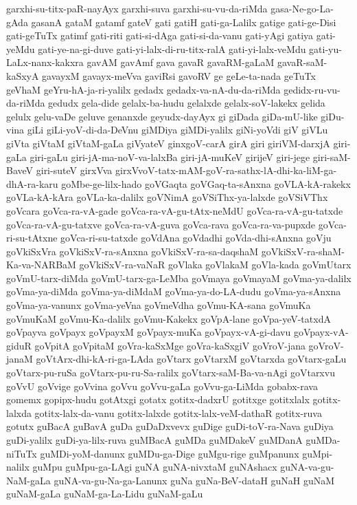 {garxhi-su-titx-paR-nayAyx
garxhi-suva
garxhi-su-vu-da-riMda
gasa-Ne-go-La-gAda
gasanA
gataM
gatamf
gateV
gati
gatiH
gati-ga-Lalilx
gatige
gati-ge-Disi
gati-geTuTx
gatimf
gati-riti
gati-si-dAga
gati-si-da-vanu
gati-yAgi
gatiya
gati-yeMdu
gati-ye-na-gi-duve
gati-yi-lalx-di-ru-titx-ralA
gati-yi-lalx-veMdu
gati-yu-LaLx-nanx-kakxra
gavAM
gavAmf
gava
gavaR
gavaRM-gaLaM
gavaR-saM-kaSxyA
gavayxM
gavayx-meVva
gaviRsi
gavoRV
ge
geLe-ta-nada
geTuTx
geVhaM
geYru-hA-ja-ri-yalilx
gedadx
gedadx-va-nA-du-da-riMda
gedidx-ru-vu-da-riMda
gedudx
gela-dide
gelalx-ba-hudu
gelalxde
gelalx-soV-lakekx
gelida
gelulx
gelu-vaDe
geluve
genanxde
geyudx-dayAyx
gi
giDada
giDa-mU-like
giDu-vina
giLi
giLi-yoV-di-da-DeVnu
giMDiya
giMDi-yalilx
giNi-yoVdi
giV
giVLu
giVta
giVtaM
giVtaM-gaLa
giVyateV
ginxgoV-carA
girA
giri
giriVM-darxjA
giri-gaLa
giri-gaLu
giri-jA-ma-noV-va-lalxBa
giri-jA-muKeV
girijeV
giri-jege
giri-saM-BaveV
giri-suteV
girxVva
girxVvoV-tatx-mAM-goV-ra-sathx-lA-dhi-ka-liM-ga-dhA-ra-karu
goMbe-ge-lilx-hado
goVGaqta
goVGaq-ta-sAnxna
goVLA-kA-rakekx
goVLa-kA-kAra
goVLa-ka-dalilx
goVNimA
goVSiThx-ya-lalxde
goVSiVThx
goVcara
goVca-ra-vA-gade
goVca-ra-vA-gu-tAtx-neMdU
goVca-ra-vA-gu-tatxde
goVca-ra-vA-gu-tatxve
goVca-ra-vA-guva
goVca-rava
goVca-ra-va-pupxde
goVca-ri-su-tAtxne
goVca-ri-su-tatxde
goVdAna
goVdadhi
goVda-dhi-sAnxna
goVju
goVkiSxVra
goVkiSxV-ra-sAnxna
goVkiSxV-ra-sa-daqshaM
goVkiSxV-ra-shaM-Ka-va-NARBaM
goVkiSxV-ra-vaNaR
goVlaka
goVlakaM
goVla-kada
goVmUtarx
goVmU-tarx-diMda
goVmU-tarx-ga-LeMba
goVmaya
goVmayaM
goVma-ya-dalilx
goVma-ya-diMda
goVma-ya-diMdaM
goVma-ya-do-LA-dudu
goVma-ya-sAnxna
goVma-ya-vanunx
goVma-yeVna
goVmeVdha
goVmu-KA-sana
goVmuKa
goVmuKaM
goVmu-Ka-dalilx
goVmu-Kakekx
goVpA-lane
goVpa-yeV-tatxdA
goVpayva
goVpayx
goVpayxM
goVpayx-muKa
goVpayx-vA-gi-davu
goVpayx-vA-giduR
goVpitA
goVpitaM
goVra-kaSxMge
goVra-kaSxgiV
goVroV-jana
goVroV-janaM
goVtArx-dhi-kA-ri-ga-LAda
goVtarx
goVtarxM
goVtarxda
goVtarx-gaLu
goVtarx-pu-ruSa
goVtarx-pu-ru-Sa-ralilx
goVtarx-saM-Ba-va-nAgi
goVtarxvu
goVvU
goVvige
goVvina
goVvu
goVvu-gaLa
goVvu-ga-LiMda
gobabx-rava
gomemx
gopipx-hudu
gotAtxgi
gotatx
gotitx-dadxrU
gotitxge
gotitxlalx
gotitx-lalxda
gotitx-lalx-da-vanu
gotitx-lalxde
gotitx-lalx-veM-dathaR
gotitx-ruva
gotutx
guBacA
guBavA
guDa
guDaDxvevx
guDige
guDi-toV-ra-Nava
guDiya
guDi-yalilx
guDi-ya-lilx-ruva
guMBacA
guMDa
guMDakeV
guMDanA
guMDa-niTuTx
guMDi-yoM-danunx
guMDu-ga-Dige
guMgu-rige
guMpanunx
guMpi-nalilx
guMpu
guMpu-ga-LAgi
guNA
guNA-nivxtaM
guNAshacx
guNA-va-gu-NaM-gaLa
guNA-va-gu-Na-ga-Lanunx
guNa
guNa-BeV-dataH
guNaH
guNaM
guNaM-gaLa
guNaM-ga-La-Lidu
guNaM-gaLu
}
